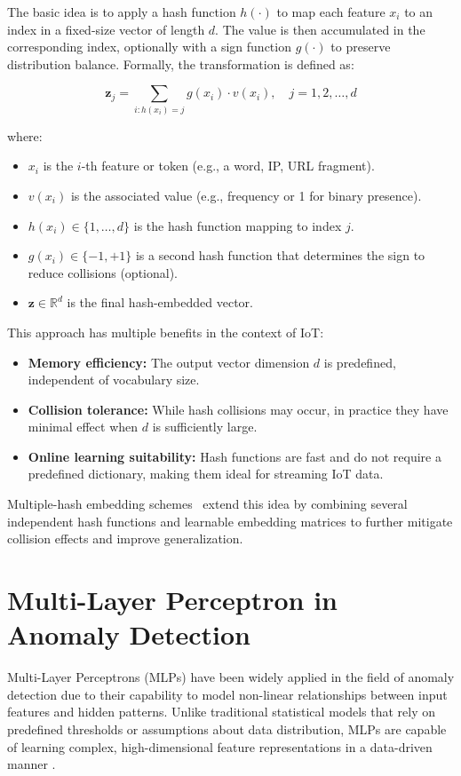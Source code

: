 \begin{ZhChapter}
    The basic idea is to apply a hash function $h(\cdot)$ to map each feature $x_i$ to an index in a fixed-size vector of length $d$. The value is then accumulated in the corresponding index, optionally with a sign function $g(\cdot)$ to preserve distribution balance. Formally, the transformation is defined as:

    \begin{equation}
        \mathbf{z}_j = \sum_{i: h(x_i) = j} g(x_i) \cdot v(x_i), \quad j = 1, 2, \dots, d
    \end{equation}

    where:
    \begin{itemize}
        \item $x_i$ is the $i$-th feature or token (e.g., a word, IP, URL fragment).
        \item $v(x_i)$ is the associated value (e.g., frequency or 1 for binary presence).
        \item $h(x_i) \in \{1, \dots, d\}$ is the hash function mapping to index $j$.
        \item $g(x_i) \in \{-1, +1\}$ is a second hash function that determines the sign to reduce collisions (optional).
        \item $\mathbf{z} \in \mathbb{R}^d$ is the final hash-embedded vector.
    \end{itemize}

    This approach has multiple benefits in the context of IoT:
    \begin{itemize}
        \item \textbf{Memory efficiency:} The output vector dimension $d$ is predefined, independent of vocabulary size.
        \item \textbf{Collision tolerance:} While hash collisions may occur, in practice they have minimal effect when $d$ is sufficiently large.
        \item \textbf{Online learning suitability:} Hash functions are fast and do not require a predefined dictionary, making them ideal for streaming IoT data.
    \end{itemize}

    Multiple-hash embedding schemes~\cite{hashingtrick} extend this idea by combining several independent hash functions and learnable embedding matrices to further mitigate collision effects and improve generalization.


    \section{Multi-Layer Perceptron in Anomaly Detection}
    Multi-Layer Perceptrons (MLPs) have been widely applied in the field of anomaly detection due to their capability to model non-linear relationships between input features and hidden patterns. Unlike traditional statistical models that rely on predefined thresholds or assumptions about data distribution, MLPs are capable of learning complex, high-dimensional feature representations in a data-driven manner \cite{lecun2015deep}.


\end{ZhChapter}
